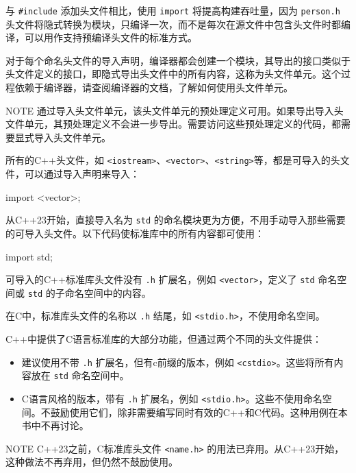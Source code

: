 与 \verb|#include| 添加头文件相比，使用 \verb|import| 将提高构建吞吐量，因为 \verb|person.h| 头文件将隐式转换为模块，只编译一次，而不是每次在源文件中包含头文件时都编译，可以用作支持预编译头文件的标准方式。

对于每个命名头文件的导入声明，编译器都会创建一个模块，其导出的接口类似于头文件定义的接口，即隐式导出头文件中的所有内容，这称为头文件单元。这个过程依赖于编译器，请查阅编译器的文档，了解如何使用头文件单元。

\begin{myNotic}{NOTE}
通过导入头文件单元，该头文件单元的预处理定义可用。如果导出导入头文件单元，其预处理定义不会进一步导出。需要访问这些预处理定义的代码，都需要显式导入头文件单元。
\end{myNotic}


所有的C++头文件，如 \verb|<iostream>|、\verb|<vector>|、\verb|<string>|等，都是可导入的头文件，可以通过导入声明来导入：

\begin{cpp}
import <vector>;
\end{cpp}

从C++23开始，直接导入名为 \verb|std| 的命名模块更为方便，不用手动导入那些需要的可导入头文件。以下代码使标准库中的所有内容都可使用：

\begin{cpp}
import std;
\end{cpp}

可导入的C++标准库头文件没有 \verb|.h| 扩展名，例如 \verb|<vector>|，定义了 \verb|std| 命名空间或 \verb|std| 的子命名空间中的内容。

在C中，标准库头文件的名称以 \verb|.h| 结尾，如 \verb|<stdio.h>|，不使用命名空间。

C++中提供了C语言标准库的大部分功能，但通过两个不同的头文件提供：

\begin{itemize}
\item
建议使用不带 \verb|.h| 扩展名，但有c前缀的版本，例如 \verb|<cstdio>|。这些将所有内容放在 \verb|std| 命名空间中。

\item
C语言风格的版本，带有 \verb|.h| 扩展名，例如 \verb|<stdio.h>|。这些不使用命名空间。不鼓励使用它们，除非需要编写同时有效的C++和C代码。这种用例在本书中不再讨论。
\end{itemize}

\begin{myNotic}{NOTE}
C++23之前，C标准库头文件 \verb|<name.h>| 的用法已弃用。从C++23开始，这种做法不再弃用，但仍然不鼓励使用。
\end{myNotic}

